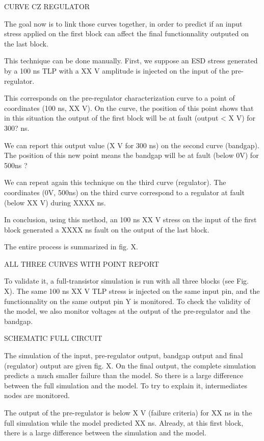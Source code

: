 CURVE CZ REGULATOR

The goal now is to link those curves together, in order to predict if an input
stress applied on the first block can affect the final functionnality outputed
on the last block.

This technique can be done manually.
First, we suppose an ESD stress generated by a 100 ns TLP with a XX V amplitude is injected on the input
of the pre-regulator.

This corresponds on the pre-regulator characterization curve to a point of coordinates (100 ns, XX V).
On the curve, the position of this point shows that in this situation the output of the first block will be at fault (output < X V) for 300? ns.

We can report this output value (X V for 300 ns) on the second curve (bandgap).
The position of this new point means the bandgap will be at fault (below 0V) for 500ns ?

We can repeat again this technique on the third curve (regulator).
The coordinates (0V, 500ns) on the third curve correspond to a regulator at fault (below XX V) during XXXX ns.

In conclusion, using this method, an 100 ns XX V stress on the input of the first block generated a XXXX ns fault on the output of the last block.

The entire process is summarized in fig. X.

ALL THREE CURVES WITH POINT REPORT

To validate it, a full-transistor simulation is run with all three blocks (see Fig. X).
The same 100 ns XX V TLP stress is injected on the same input pin, and the functionnality on the same output pin Y is monitored.
To check the validity of the model, we also monitor voltages at the output of the pre-regulator and the bandgap.

SCHEMATIC FULL CIRCUIT

The simulation of the input, pre-regulator output, bandgap output and final (regulator) output are given fig. X.
On the final output, the complete simulation predicts a much smaller failure than the model.
So there is a large difference between the full simulation and the model.
To try to explain it, intermediates nodes are monitored.

The output of the pre-regulator is below X V (failure criteria) for XX ns in the full simulation while the model predicted XX ns.
Already, at this first block, there is a large difference between the simulation and the model.

